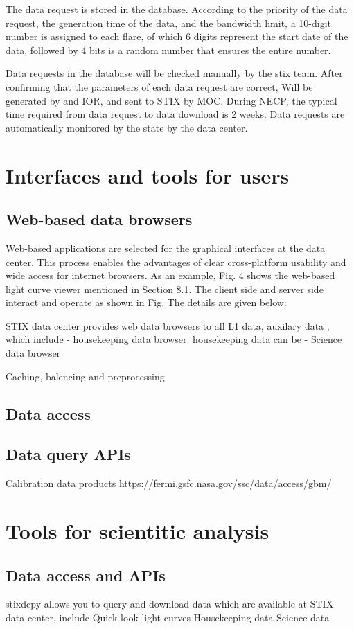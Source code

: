 \documentclass{aa}
\begin{document}
The data request is stored in the database. According to the priority of the data request,
 the generation time of the data, and the bandwidth limit, a 10-digit number is assigned to each flare,
  of which 6 digits represent the start date of the data, followed by 4 bits is a random number that ensures the entire number.

Data requests in the database will be checked manually by the stix team. 
After confirming that the parameters of each data request are correct,
Will be generated by and IOR, and sent to STIX by MOC. During NECP,
 the typical time required from data request to data download is 2 weeks. 
 Data requests are automatically monitored by the state by the data center.


\section{Interfaces and tools for users}
\subsection{Web-based data browsers}
Web-based applications are selected for the graphical
 interfaces at the data center. 
 This process enables the advantages 
 of clear cross-platform usability and wide access for internet browsers. 
 As an example, Fig. 4 shows the web-based light curve viewer mentioned in Section 8.1.
 The client side and server side interact and operate as shown in Fig. 
  The details are given below:

STIX data center provides web data browsers to all L1 data, auxilary data , which include 
- housekeeping data browser.  housekeeping data can be 
- Science data browser

Caching, balencing and preprocessing
\subsection{Data access}

\subsection{Data query APIs}
Calibration data products
https://fermi.gsfc.nasa.gov/ssc/data/access/gbm/
\section{Tools for scientitic analysis }
\subsection{Data access and APIs}
stixdcpy allows you to query and download data which are available at STIX data center, include
Quick-look light curves
Housekeeping data
Science data
\end{document}
